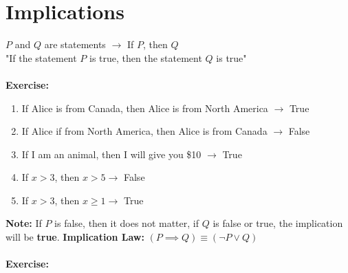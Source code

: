 \documentclass[11pt, a4paper]{memoir}
\theoremstyle{change}
\theoremstyle{plain}
\theoremstyle{nonumberplain}
\numberwithin{equation}{section}
\begin{document}
\section{Implications}
$P$ and $Q$ are statements $\to$ If $P$, then $Q$\\
"If the statement $P$ is true, then the statement $Q$ is true"\\ \: \\
\textbf{Exercise:}
\begin{enumerate}
    \item If Alice is from Canada, then Alice is from North America $\to$ True
    \item If Alice if from North America, then Alice is from Canada $\to$ False
    \item If I am an animal, then I will give you \${10} $\to$ True
    \item If $x > 3$, then $x > 5 \to$ False
    \item If $x > 3$, then $x \ge 1 \to$ True 
\end{enumerate}
\textbf{Note:} If $P$ is false, then it does not matter, if $Q$ is false or true, the implication will be \textbf{true}.
\textbf{Implication Law: } $(P \implies Q) \equiv (\neg P \vee Q)$\\ \: \\
\textbf{Exercise:}
\end{document}
